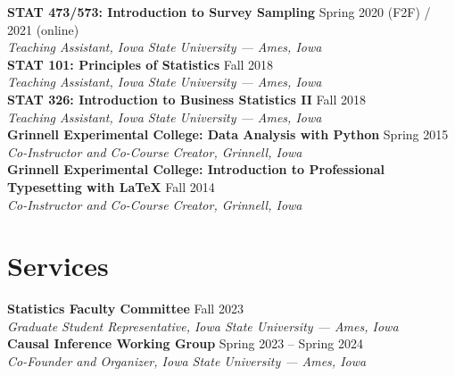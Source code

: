 \documentclass[11pt]{article}
\newcommand{\entry}[3]{%
  \noindent\textbf{#1} \hfill #3\\
  \textit{#2}\\[4pt]
}
\begin{document}
\entry{STAT 473/573: Introduction to Survey Sampling}{Teaching Assistant, Iowa State University --- Ames, Iowa}{Spring 2020 (F2F) / 2021 (online)}

\entry{STAT 101: Principles of Statistics}{Teaching Assistant, Iowa State University --- Ames, Iowa}{Fall 2018}

\entry{STAT 326: Introduction to Business Statistics II}{Teaching Assistant, Iowa State University --- Ames, Iowa}{Fall 2018}

\entry{Grinnell Experimental College: Data Analysis with Python}{Co-Instructor and Co-Course Creator, Grinnell, Iowa}{Spring 2015}
\entry{Grinnell Experimental College: Introduction to Professional Typesetting with \LaTeX}{Co-Instructor and Co-Course Creator, Grinnell, Iowa}{Fall 2014}

\section*{Services}
\entry{Statistics Faculty Committee}{Graduate Student Representative, Iowa State University --- Ames, Iowa}{Fall 2023}
\entry{Causal Inference Working Group}{Co-Founder and Organizer, Iowa State University --- Ames, Iowa}{Spring 2023 -- Spring 2024}
\end{document}
